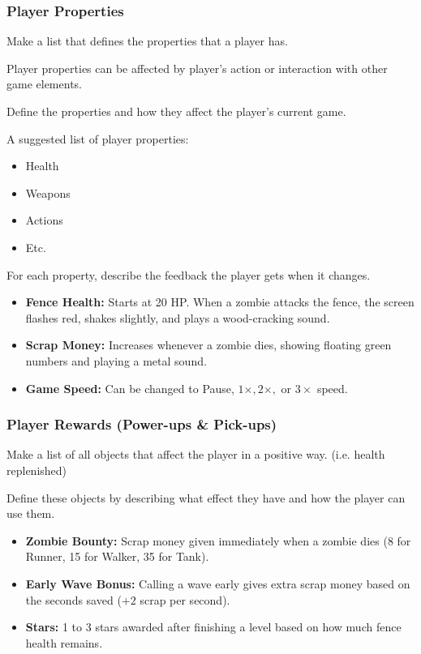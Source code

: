 \subsubsection{Player Properties}

\begin{guidance}
Make a list that defines the properties that a player has.

Player properties can be affected by player’s action or interaction with other game elements.

Define the properties and how they affect the player’s current game.

A suggested list of player properties:

\begin{itemize}[label=\textendash]
  \item Health
  \item Weapons
  \item Actions
  \item Etc.
\end{itemize}
For each property, describe the feedback the player gets when it changes.
\end{guidance}
\begin{itemize}[label=\textbullet]
  \item \textbf{Fence Health:} Starts at 20 HP. When a zombie attacks the fence, the screen flashes red, shakes slightly, and plays a wood-cracking sound.
  \item \textbf{Scrap Money:} Increases whenever a zombie dies, showing floating green numbers and playing a metal sound.
  \item \textbf{Game Speed:} Can be changed to Pause, $1\times, 2\times,$ or $3\times$ speed.
\end{itemize}

\subsubsection{Player Rewards (Power-ups \& Pick-ups)}

\begin{guidance}
Make a list of all objects that affect the player in a positive way. (i.e. health replenished)

Define these objects by describing what effect they have and how the player can use them.
\end{guidance}
\begin{itemize}[label=\textbullet]
  \item \textbf{Zombie Bounty:} Scrap money given immediately when a zombie dies (8 for Runner, 15 for Walker, 35 for Tank).
  \item \textbf{Early Wave Bonus:} Calling a wave early gives extra scrap money based on the seconds saved ($+2$ scrap per second).
  \item \textbf{Stars:} 1 to 3 stars awarded after finishing a level based on how much fence health remains.
\end{itemize}

